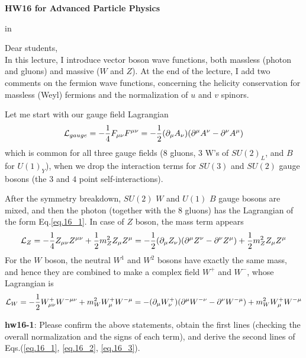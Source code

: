 \documentclass[12pt]{article}
\def\del{{\partial}}
\begin{document}
\begin{center}
{\large\bf HW16 for Advanced Particle Physics} \\

\end{center}

 in

Dear students,\\
In this lecture, I introduce vector boson wave functions, both massless
(photon and gluons) and massive ($W$ and $Z$).  At the end of the lecture,
I add two comments on the fermion wave functions, concerning the
helicity conservation for massless (Weyl) fermions and the normalization
of $u$ and $v$ spinors.

Let me start with our gauge field Lagrangian
\begin{eqnarray}
  {\cal L}_{gauge}
= -\frac{1}{4} F_{\mu\nu} F^{\mu\nu}
= -\frac{1}{2} (\del_\mu A_\nu) (\del^\mu A^\nu -\del^\nu A^\mu) \label{eq.16_1}
\end{eqnarray}
which is common for all three gauge fields ($8$ gluons, $3$ W's of $SU(2)_L$,
and $B$ for $U(1)_Y$), when we drop the interaction terms for $SU(3)$
and $SU(2)$ gauge bosons (the $3$ and $4$ point self-interactions).

After the symmetry breakdown, $SU(2)$ $W$ and $U(1)$ $B$ gauge bosons are mixed,
and then the photon (together with the $8$ gluons) has the Lagrangian of
the form Eq.\ref{eq.16_1}. In case of $Z$ boson, the mass term appears
\begin{eqnarray}
  {\cal L}_{Z}
  = -\frac{1}{4} Z_{\mu\nu} Z^{\mu\nu} +\frac{1}{2} m_Z^2 Z_\mu Z^\mu
  = -\frac{1}{2} (\del_\mu Z_\nu) (\del^\mu Z^\nu -\del^\nu Z^\mu)
    +\frac{1}{2} m_Z^2 Z_\mu Z^\mu \label{eq.16_2}
\end{eqnarray}
For the $W$ boson, the neutral $W^1$ and $W^2$ bosons have exactly the same mass, and hence they are combined to make a complex field $W^+$ and $W^-$,
whose Lagrangian is
\begin{eqnarray}
  {\cal L}_{W}
= -\frac{1}{2} W^+_{\mu\nu} W^{- \mu\nu} + m_W^2 W^+_\mu W^{- \mu}
= - (\del_\mu W^+_\nu) (\del^\mu W^{-\nu} -\del^\nu W^{-\mu}) + m_W^2 W^+_\mu W^{-\mu} \label{eq.16_3}
\end{eqnarray}

{\bf hw16-1}: Please confirm the above statements, obtain the first lines (checking the overall normalization and the signs of each term), and derive the second lines of Eqs.(\ref{eq.16_1}, \ref{eq.16_2}, \ref{eq.16_3}).
\end{document}
